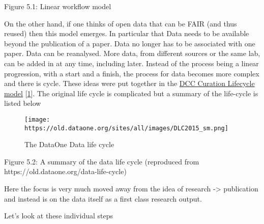 \documentclass[
  letterpaper,
  DIV=11,
  numbers=noendperiod]{scrreport}
\begin{document}
Figure 5.1: Linear workflow model

On the other hand, if one thinks of open data that can be FAIR (and thus
reused) then this model emerges. In particular that Data needs to be
available beyond the publication of a paper. Data no longer has to be
associated with one paper. Data can be reanalysed. More data, from
different sources or the same lab, can be added in at any time,
including later. Instead of the process being a linear progression, with
a start and a finish, the process for data becomes more complex and
there is cycle. These ideas were put together in the
\href{http://www.ijdc.net/article/view/69}{DCC Curation Lifecycle model}
{[}\href{https://doi.org/10.2218/ijdc.v3i1.48}{1}{]}. The original life
cycle is complicated but a summary of the life-cycle is listed below

\begin{figure}

{\centering \texttt{[image: https://old.dataone.org/sites/all/images/DLC2015\_sm.png]}

}

\caption{The DataOne Data life cycle}

\end{figure}

Figure 5.2: A summary of the data life cycle (reproduced from
https://old.dataone.org/data-life-cycle)

Here the focus is very much moved away from the idea of research
-\textgreater{} publication and instead is on the data itself as a first
class research output.

Let's look at these individual steps
\end{document}
